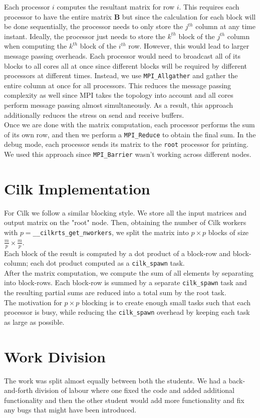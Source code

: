 \documentclass[11pt]{article}
\begin{document}
Each processor $i$ computes the resultant matrix for row $i$. This requires each processor to have the entire matrix $\mathbf{B}$ but since the calculation for each block will be done sequentially, the processor needs to only store the $j^{th}$ column at any time instant. Ideally, the processor just needs to store the $k^{th}$ block of the $j^{th}$ column when computing the $k^{th}$ block of the $i^{th}$ row. However, this would lead to larger message passing overheads. Each processor would need to broadcast all of its blocks to all cores all at once since different blocks will be required by different processors at different times. Instead, we use \texttt{MPI\_Allgather} and gather the entire column at once for all processors. This reduces the message passing complexity as well since MPI takes the topology into account and all cores perform message passing almost simultaneously. As a result, this approach additionally reduces the stress on send and receive buffers.\\

Once we are done with the matrix computation, each processor performs the sum of its own row, and then we perform a \texttt{MPI\_Reduce} to obtain the final sum. In the debug mode, each processor sends its matrix to the \texttt{root} processor for printing. We used this approach since \texttt{MPI\_Barrier} wasn't working across different nodes.

\section{Cilk Implementation}
For Cilk we follow a similar blocking style. We store all the input matrices and output matrix on the "root" node. Then, obtaining the number of Cilk workers with $p=$\texttt{__cilkrts_get_nworkers}, we split the matrix into $p\times p$ blocks of size $\frac{m}{p}\times\frac{m}{p}$.\\

Each block of the result is computed by a dot product of a block-row and block-column; each dot product computed as a \texttt{cilk_spawn} task.\\

After the matrix computation, we compute the sum of all elements by separating into block-rows. Each block-row is summed by a separate \texttt{cilk_spawn} task and the resulting partial sums are reduced into a total sum by the root task.\\

The motivation for $p\times p$ blocking is to create enough small tasks such that each processor is busy, while reducing the \texttt{cilk_spawn} overhead by keeping each task as large as possible.

\section{Work Division}
The work was split almost equally between both the students. We had a back-and-forth division of labour where one fixed the code and added additional functionality and then the other student would add more functionality and fix any bugs that might have been introduced.
\end{document}
